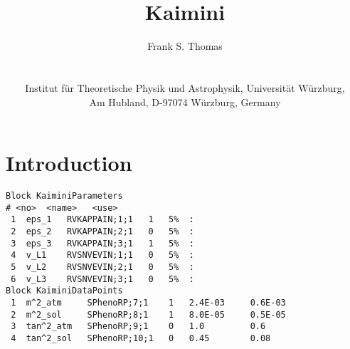 \documentclass[a4paper,12pt]{article}
\title{\textbf{Kaimini}}
\author{
  Frank S. Thomas\\
  \texttt{\mailto{fthomas@physik.uni-wuerzburg.de}}\\
  \vspace{1em}\\
  Institut für Theoretische Physik und Astrophysik, Universität Würzburg,\\
  Am Hubland, D-97074 Würzburg, Germany
}
\begin{document}
\maketitle

\begin{abstract}
\end{abstract}

\section{Introduction}

\begin{Verbatim}[frame=single]
Block KaiminiParameters
# <no>  <name>   <use> 
 1  eps_1   RVKAPPAIN;1;1   1   5%  :
 2  eps_2   RVKAPPAIN;2;1   0   5%  :
 3  eps_3   RVKAPPAIN;3;1   1   5%  :
 4  v_L1    RVSNVEVIN;1;1   0   5%  :
 5  v_L2    RVSNVEVIN;2;1   0   5%  :
 6  v_L3    RVSNVEVIN;3;1   0   5%  :
Block KaiminiDataPoints
 1  m^2_atm     SPhenoRP;7;1    1   2.4E-03     0.6E-03
 2  m^2_sol     SPhenoRP;8;1    1   8.0E-05     0.5E-05
 3  tan^2_atm   SPhenoRP;9;1    0   1.0         0.6
 4  tan^2_sol   SPhenoRP;10;1   0   0.45        0.08
\end{Verbatim}
\end{document}
